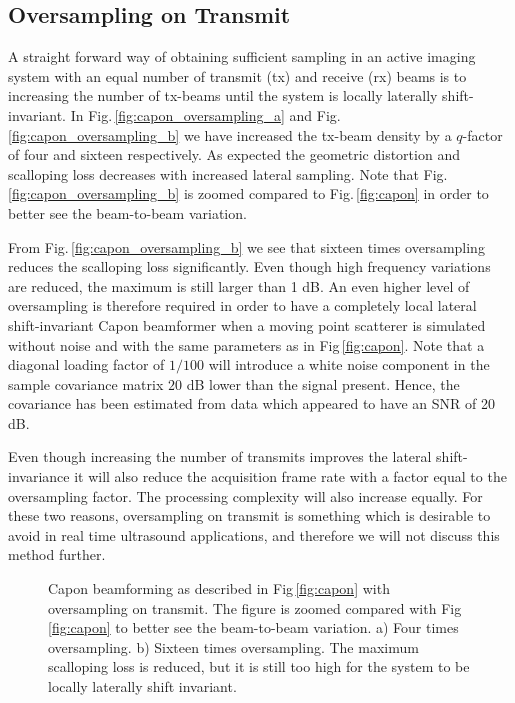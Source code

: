 \documentclass[draftcls]{IEEEtran}
\newcommand{\img}{img/}
\begin{document}
\subsection{Oversampling on Transmit}
A straight forward way of obtaining sufficient sampling in an active imaging system with an equal number of transmit (tx) and receive (rx) beams is to increasing the number of tx-beams until the system is locally laterally shift-invariant. In Fig.\,\ref{fig:capon_oversampling_a} and Fig.\,\ref{fig:capon_oversampling_b} we have increased the tx-beam density by a $q$-factor of four and sixteen respectively. As expected the geometric distortion and scalloping loss decreases with increased lateral sampling. Note that Fig.\,\ref{fig:capon_oversampling_b} is zoomed compared to Fig.\,\ref{fig:capon} in order to better see the beam-to-beam variation.

From Fig.\,\ref{fig:capon_oversampling_b} we see that sixteen times oversampling reduces the scalloping loss significantly. Even though high frequency variations are reduced, the maximum is still larger than 1 dB. An even higher level of oversampling is therefore required in order to have a completely local lateral shift-invariant Capon beamformer when a moving point scatterer is simulated without noise and with the same parameters as in Fig\,\ref{fig:capon}. %
Note that a diagonal loading factor of $1/100$ will introduce a white noise component in the sample covariance matrix $20$ dB lower than the signal present. Hence, the covariance has been estimated from data which appeared to have an SNR of 20 dB.

Even though increasing the number of transmits improves the lateral shift-invariance it will also reduce the acquisition frame rate with a factor equal to the oversampling factor. The processing complexity will also increase equally. For these two reasons, oversampling on transmit is something which is desirable to avoid in real time ultrasound applications, and therefore we will not discuss this method further.

\begin{figure*}[!t]
\centerline{
}
\caption{Capon beamforming as described in Fig\,\ref{fig:capon} with oversampling on transmit. The figure is zoomed compared with Fig\,\ref{fig:capon} to better see the beam-to-beam variation. a) Four times oversampling. b) Sixteen times oversampling. The maximum scalloping loss is reduced, but it is still too high for the system to be locally laterally shift invariant.}
\label{fig:capon_oversampling}
\end{figure*}
\end{document}
